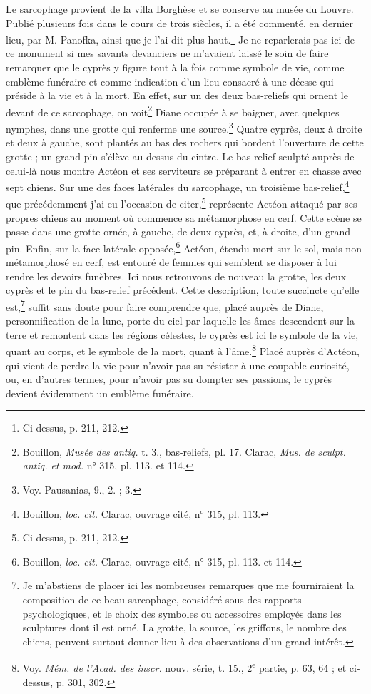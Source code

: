 \documentclass{article}
\begin{document}
Le sarcophage provient de la villa Borghèse et se conserve au musée du Louvre. Publié plusieurs fois dans le cours de trois siècles, il a été commenté, en dernier lieu, par M. Panofka, ainsi que je l'ai dit plus haut.\footnote{Ci-dessus, p. 211, 212.} Je ne reparlerais pas ici de ce monument si mes savants devanciers ne m'avaient laissé le soin de faire remarquer que le cyprès y figure tout à la fois comme symbole de vie, comme emblème funéraire et comme indication d'un lieu consacré à une déesse qui préside à la vie et à la mort. En effet, sur un des deux bas-reliefs qui ornent le devant de ce sarcophage, on voit\footnote{Bouillon, \emph{Musée des antiq.} t. 3., bas-reliefs, pl. 17. Clarac, \emph{Mus. de sculpt. antiq. et mod.} n° 315, pl. 113. et 114.} Diane occupée à se baigner, avec quelques nymphes, dans une grotte qui renferme une source.\footnote{Voy. Pausanias, 9., 2. ; 3.} Quatre cyprès, deux à droite et deux à gauche, sont plantés au bas des rochers qui bordent l'ouverture de cette grotte ; un grand pin s'élève au-dessus du cintre. Le bas-relief sculpté auprès de celui-là nous montre Actéon et ses serviteurs se préparant à entrer en chasse avec sept chiens. Sur une des faces latérales du sarcophage, un troisième bas-relief,\footnote{Bouillon, \emph{loc. cit.} Clarac, ouvrage cité, n° 315, pl. 113.} que précédemment j'ai eu l'occasion de citer,\footnote{Ci-dessus, p. 211, 212.} représente Actéon attaqué par ses propres chiens au moment où commence sa métamorphose en cerf. Cette scène se passe dans une grotte ornée, à gauche, de deux cyprès, et, à droite, d'un grand pin. Enfin, sur la face latérale opposée,\footnote{Bouillon, \emph{loc. cit.} Clarac, ouvrage cité, n° 315, pl. 113. et 114.} Actéon, étendu mort sur le sol, mais non métamorphosé en cerf, est entouré de femmes qui semblent se disposer à lui rendre les devoirs funèbres. Ici nous retrouvons de nouveau la grotte, les deux cyprès et le pin du bas-relief précédent. Cette description, toute succincte qu'elle est,\footnote{Je m'abstiens de placer ici les nombreuses remarques que me fourniraient la composition de ce beau sarcophage, considéré sous des rapports psychologiques, et le choix des symboles ou accessoires employés dans les sculptures dont il est orné. La grotte, la source, les griffons, le nombre des chiens, peuvent surtout donner lieu à des observations d'un grand intérêt.} suffit sans doute pour faire comprendre que, placé auprès de Diane, personnification de la lune, porte du ciel par laquelle les âmes descendent sur la terre et remontent dans les régions célestes, le cyprès est ici le symbole de la vie, quant au corps, et le symbole de la mort, quant à l'âme.\footnote{Voy. \emph{Mém. de l'Acad. des inscr.} nouv. série, t. 15., 2\textsuperscript{e} partie, p. 63, 64 ; et ci-dessus, p. 301, 302.} Placé auprès d'Actéon, qui vient de perdre la vie pour n'avoir pas su résister à une coupable curiosité, ou, en d'autres termes, pour n'avoir pas su dompter ses passions, le cyprès devient évidemment un emblème funéraire.
\end{document}
